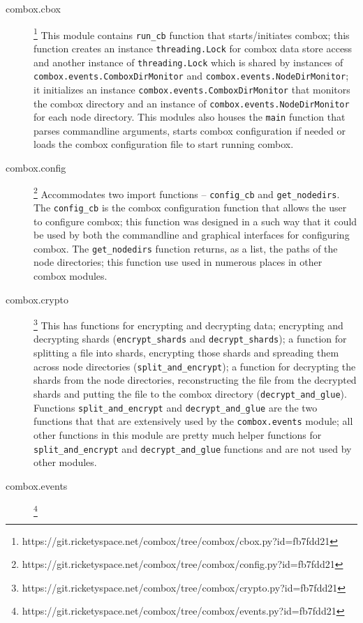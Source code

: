 \begin{description}
\item[combox.cbox]\footnote{https://git.ricketyspace.net/combox/tree/combox/cbox.py?id=fb7fdd21}
  This module contains \verb+run_cb+ function that starts/initiates
  combox; this function creates an instance \verb+threading.Lock+ for
  combox data store access and another instance of
  \verb+threading.Lock+ which is shared by instances of
  \verb+combox.events.ComboxDirMonitor+ and
  \verb+combox.events.NodeDirMonitor+; it initializes an instance
  \verb+combox.events.ComboxDirMonitor+ that monitors the combox
  directory and an instance of \verb+combox.events.NodeDirMonitor+ for
  each node directory. This modules also houses the \verb+main+
  function that parses commandline arguments, starts combox
  configuration if needed or loads the combox configuration file to
  start running combox.
\item[combox.config]\footnote{https://git.ricketyspace.net/combox/tree/combox/config.py?id=fb7fdd21}
  Accommodates two import functions -- \verb+config_cb+ and
  \verb+get_nodedirs+. The \verb+config_cb+ is the combox
  configuration function that allows the user to configure combox;
  this function was designed in a such way that it could be used by
  both the commandline and graphical interfaces for configuring
  combox. The \verb+get_nodedirs+ function returns, as a list, the
  paths of the node directories; this function use used in numerous
  places in other combox modules.
\item[combox.crypto]\footnote{https://git.ricketyspace.net/combox/tree/combox/crypto.py?id=fb7fdd21}
  This has functions for encrypting and decrypting data; encrypting
  and decrypting shards (\verb+encrypt_shards+ and
  \verb+decrypt_shards+); a function for splitting a file into shards,
  encrypting those shards and spreading them across node directories
  (\verb+split_and_encrypt+); a function for decrypting the shards
  from the node directories, reconstructing the file from the
  decrypted shards and putting the file to the combox directory
  (\verb+decrypt_and_glue+). Functions \verb+split_and_encrypt+ and
  \verb+decrypt_and_glue+ are the two functions that that are
  extensively used by the \verb+combox.events+ module; all other
  functions in this module are pretty much helper functions for
  \verb+split_and_encrypt+ and \verb+decrypt_and_glue+ functions and
  are not used by other modules.
\item[combox.events]\footnote{https://git.ricketyspace.net/combox/tree/combox/events.py?id=fb7fdd21}

\end{description}
